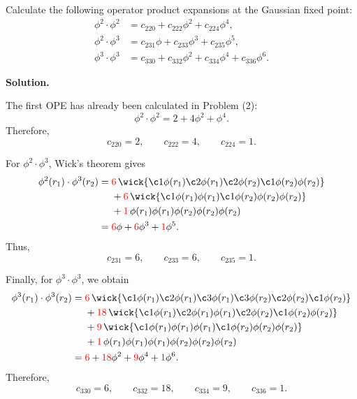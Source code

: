 \documentclass[11pt,a4paper]{article}
\newcounter{problem}
\newcounter{saveequation}
\newenvironment{solution}
{
	\par
	\setcounter{saveequation}{\value{equation}}
	\begingroup
	\setcounter{equation}{0}
	\renewcommand{\theequation}{\arabic{problem}.\arabic{equation}}
	\renewcommand{\theHequation}{sol.\arabic{problem}.\arabic{equation}}
	\noindent\textbf{Solution.}\quad
}
{
	\par
	\endgroup
	\setcounter{equation}{\value{saveequation}}
}
\begin{document}
	\begin{problembox}
		Calculate the following operator product expansions at the Gaussian fixed point:
		\begin{align}
			\phi^2\cdot\phi^2 &= c_{220}+c_{222}\phi^2+c_{224}\phi^4,\\
			\phi^2\cdot\phi^3 &= c_{231}\phi+c_{233}\phi^3+c_{235}\phi^5,\\
			\phi^3\cdot\phi^3 &= c_{330}+c_{332}\phi^2+c_{334}\phi^4+c_{336}\phi^6.
		\end{align}
	\end{problembox}
	\begin{solution}
				The first OPE has already been calculated in Problem (2):
		\begin{equation}
			\phi^2\cdot\phi^2
			=
			2+4\phi^2+\phi^4.
		\end{equation}
		Therefore,
		\[
		c_{220}=2,
		\qquad
		c_{222}=4,
		\qquad
		c_{224}=1.
		\]
		
		For $\phi^2\cdot\phi^3$, Wick's theorem gives
		\begin{align}
			\phi^2(r_1)\cdot\phi^3(r_2)
			={}&
			\textcolor{red}{6}\,
			\wick{
				\c1\phi(r_1)\c2\phi(r_1)
				\c2\phi(r_2)\c1\phi(r_2)\phi(r_2)
			}
			\notag\\
			&+
			\textcolor{red}{6}\,
			\wick{
				\c1\phi(r_1)\phi(r_1)
				\c1\phi(r_2)\phi(r_2)\phi(r_2)
			}
			\notag\\
			&+
			\textcolor{red}{1}\,
			\phi(r_1)\phi(r_1)
			\phi(r_2)\phi(r_2)\phi(r_2)
			\notag\\
			={}&
			\textcolor{red}{6}\phi
			+\textcolor{red}{6}\phi^3
			+\textcolor{red}{1}\phi^5.
		\end{align}
		Thus,
		\[
		c_{231}=6,
		\qquad
		c_{233}=6,
		\qquad
		c_{235}=1.
		\]
		
		Finally, for $\phi^3\cdot\phi^3$, we obtain
		\begin{align}
			\phi^3(r_1)\cdot\phi^3(r_2)
			={}&
			\textcolor{red}{6}\,
			\wick{
				\c1\phi(r_1)\c2\phi(r_1)\c3\phi(r_1)
				\c3\phi(r_2)\c2\phi(r_2)\c1\phi(r_2)
			}
			\notag\\
			&+
			\textcolor{red}{18}\,
			\wick{
				\c1\phi(r_1)\c2\phi(r_1)\phi(r_1)
				\c2\phi(r_2)\c1\phi(r_2)\phi(r_2)
			}
			\notag\\
			&+
			\textcolor{red}{9}\,
			\wick{
				\c1\phi(r_1)\phi(r_1)\phi(r_1)
				\c1\phi(r_2)\phi(r_2)\phi(r_2)
			}
			\notag\\
			&+
			\textcolor{red}{1}\,
			\phi(r_1)\phi(r_1)\phi(r_1)
			\phi(r_2)\phi(r_2)\phi(r_2)
			\notag\\
			={}&
			\textcolor{red}{6}
			+\textcolor{red}{18}\phi^2
			+\textcolor{red}{9}\phi^4
			+\textcolor{red}{1}\phi^6.
		\end{align}
		Therefore,
		\[
		c_{330}=6,
		\qquad
		c_{332}=18,
		\qquad
		c_{334}=9,
		\qquad
		c_{336}=1.
		\]
		

\end{solution}
\end{document}
